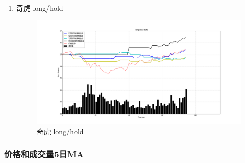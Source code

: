 \documentclass[12pt,a4paper]{article}
\begin{document}
\begin{enumerate}[1.]
\item 奇虎 long/hold

\begin{figure}[H]
	\centering
	\includegraphics[width=1.0\textwidth]{img_r_2/hold/qihu.png}
	\caption{奇虎 long/hold}
\end{figure}

\end{enumerate}

\subsubsection{价格和成交量5日MA}
\end{document}
